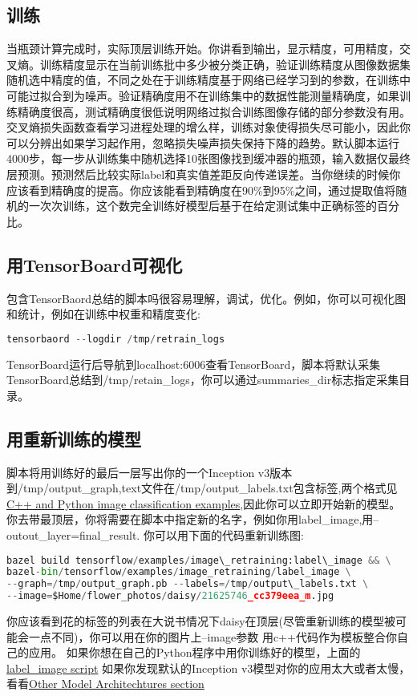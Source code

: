 \subsection{训练}
当瓶颈计算完成时，实际顶层训练开始。你讲看到输出，显示精度，可用精度，交叉熵。训练精度显示在当前训练批中多少被分类正确，验证训练精度从图像数据集随机选中精度的值，不同之处在于训练精度基于网络已经学习到的参数，在训练中可能过拟合到为噪声。验证精确度用不在训练集中的数据性能测量精确度，如果训练精确度很高，测试精确度很低说明网络过拟合训练图像存储的部分参数没有用。交叉熵损失函数查看学习进程处理的增么样，训练对象使得损失尽可能小，因此你可以分辨出如果学习起作用，忽略损失噪声损失保持下降的趋势。默认脚本运行4000步，每一步从训练集中随机选择10张图像找到缓冲器的瓶颈，输入数据仅最终层预测。预测然后比较实际label和真实值差距反向传递误差。当你继续的时候你应该看到精确度的提高。你应该能看到精确度在90\%到95\%之间，通过提取值将随机的一次次训练，这个数完全训练好模型后基于在给定测试集中正确标签的百分比。
\subsection{用TensorBoard可视化}
包含TensorBaord总结的脚本吗很容易理解，调试，优化。例如，你可以可视化图和统计，例如在训练中权重和精度变化:
\begin{lstlisting}[language=Python]
tensorbaord --logdir /tmp/retrain_logs
\end{lstlisting}
TensorBoard运行后导航到localhost:6006查看TensorBoard，脚本将默认采集TensorBoard总结到/tmp/retain\_logs，你可以通过summaries\_dir标志指定采集目录。
\subsection{用重新训练的模型}
脚本将用训练好的最后一层写出你的一个Inception v3版本到/tmp/output\_graph,text文件在/tmp/output\_labels.txt包含标签,两个格式见
\href{https://www.tensorflow.org/tutorials/image_recognition}{C++ and Python image classification examples},因此你可以立即开始新的模型。你去带最顶层，你将需要在脚本中指定新的名字，例如你用label\_image,用--outout\_layer=final\_result.
你可以用下面的代码重新训练图:
\begin{lstlisting}[language=Python]
bazel build tensorflow/examples/image\_retraining:label\_image && \
bazel-bin/tensorflow/examples/image_retraining/label_image \
--graph=/tmp/output_graph.pb --labels=/tmp/output\_labels.txt \
--image=$Home/flower_photos/daisy/21625746_cc379eea_m.jpg
\end{lstlisting}
你应该看到花的标签的列表在大说书情况下daisy在顶层(尽管重新训练的模型被可能会一点不同)，你可以用在你的图片上--image参数
用c++代码作为模板整合你自己的应用。
如果你想在自己的Python程序中用你训练好的模型，上面的\href{https://www.github.com/tensorflow/tensorflow/blob/r1.3/tensorflow/examples/image_retraining/label_image.py}{label\_image script}
如果你发现默认的Inception v3模型对你的应用太大或者太慢，看看\href{https://www.tensorflow.org/tutorials/image_retraining#other_model_architectures}{Other Model Architechtures section}
